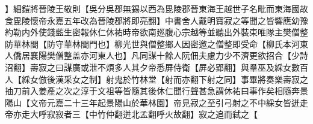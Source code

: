 】細鎧將晉陵王敬則【吳分吳郡無錫以西為毘陵郡晉東海王越世子名毗而東海國故食毘陵懷帝永嘉五年改為晉陵郡將即亮翻】中書舍人戴明寶寂之等聞之皆響應幼豫約勒内外使錢藍生密報休仁休祐時帝欲南廵腹心宗越等並聽出外裝束唯隊主樊僧整防華林閤【防守華林閤門也】柳光世與僧整鄉人因密邀之僧整即受命【柳氏本河東人僑居襄陽樊僧整盖亦河東人也】凡同謀十餘人阮佃夫慮力少不濟更欲招合【少詩沼翻】壽寂之曰謀廣或泄不煩多人其夕帝悉屏侍衛【屏必郢翻】與羣巫及綵女數百人【綵女倣後漢采女之制】射鬼於竹林堂【射而亦翻下射之同】事畢將奏樂壽寂之抽刀前入姜產之次之淳于文祖等皆隨其後休仁聞行聲甚急謂休祐曰事作矣相隨奔景陽山【文帝元嘉二十三年起景陽山於華林園】帝見寂之至引弓射之不中綵女皆迸走帝亦走大呼寂寂者三【中竹仲翻迸北孟翻呼火故翻】寂之追而弑之【